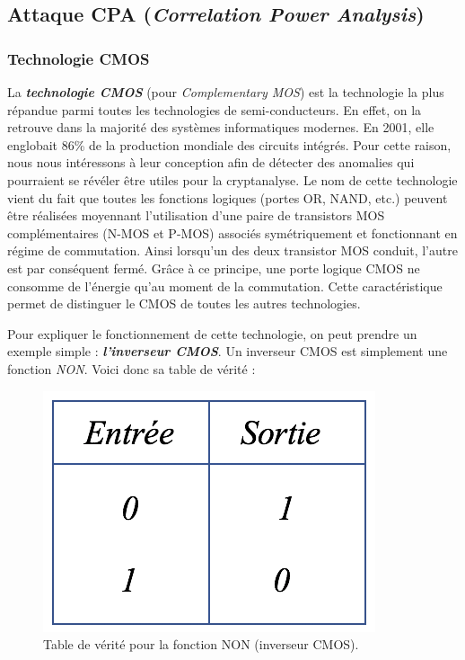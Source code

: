 \documentclass[10pt, oneside, a4paper]{article}
\begin{document}
\newpage

\subsection{Attaque CPA (\textit{Correlation Power Analysis})}
\label{sec:CPA}

\subsubsection{Technologie CMOS}
\label{sec:CMOS}
La \textbf{\textit{technologie CMOS}} (pour \textit{Complementary MOS}) est la technologie la plus répandue parmi toutes les technologies de semi-conducteurs. En effet, on la retrouve dans la majorité des systèmes informatiques modernes. En 2001, elle englobait 86\% de la production mondiale des circuits intégrés. Pour cette raison, nous nous intéressons à leur conception afin de détecter des anomalies qui pourraient se révéler être utiles pour la cryptanalyse. Le nom de cette technologie vient du fait que toutes les fonctions logiques (portes OR, NAND, etc.) peuvent être réalisées moyennant l’utilisation d’une paire de transistors MOS complémentaires (N-MOS et P-MOS) associés symétriquement et fonctionnant en régime de commutation. Ainsi lorsqu'un des deux transistor MOS conduit, l’autre est par conséquent fermé. Grâce à ce principe, une porte logique CMOS ne consomme de l’énergie qu’au moment de la commutation. Cette caractéristique permet de distinguer le CMOS de toutes les autres technologies.

\hspace{-0.5 cm}Pour expliquer le fonctionnement de cette technologie, on peut prendre un exemple simple : \textbf{\textit{l'inverseur CMOS}}. Un inverseur CMOS est simplement une fonction \textit{NON}. Voici donc sa table de vérité :
\begin{figure}[htbp]
    \centering
    \includegraphics[scale=0.5]{image/verite}
    \caption{Table de vérité pour la fonction NON (inverseur CMOS).}
    \label{fig:verite} 
\end{figure}
\end{document}
